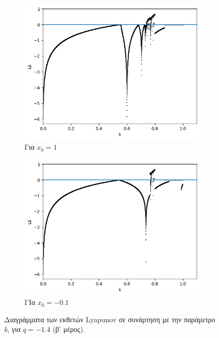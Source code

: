 \begin{figure}[ht]
	\centering
	
	\begin{subfigure}[b]{1\textwidth}
		\centering
		\includegraphics[width=\textwidth]{LateX images/graphs q14/g8}
		\caption{Για \(x_0=1\)}
		\label{f:g25}
	\end{subfigure}
	\hfill
	\begin{subfigure}[b]{1\textwidth}
		\centering
		\includegraphics[width=\textwidth]{LateX images/graphs q14/g9}
		\caption{ΓΙα \(x_0=-0.1\)}
		\label{f:g26}
	\end{subfigure}
	\hfill
	\caption{ Διαγράμματα των εκθετών Lyapunov σε συνάρτηση με την παράμετρο \emph{k}, για  $q=-1.4$ (β' μέρος).}
	\label{f:g2333}
\end{figure}

